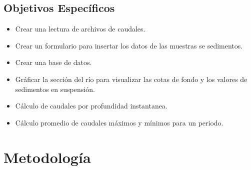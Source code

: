 \documentclass[12pt,a4paper]{report}
\begin{document}
	\subsection{Objetivos Específicos}
	\begin{itemize}
	\item Crear una lectura de archivos de caudales.
	\item Crear un formulario para insertar los datos de las muestras se sedimentos.
	\item Crear una base de datos.
	\item Gráficar la sección del río para visualizar las cotas de fondo y los valores de sedimentos en suspensión.
	\item Cálculo de caudales por profundidad instantanea.
	\item Cálculo promedio de caudales máximos y mínimos para un periodo.
	\end{itemize}
\section{Metodología}
\end{document}
